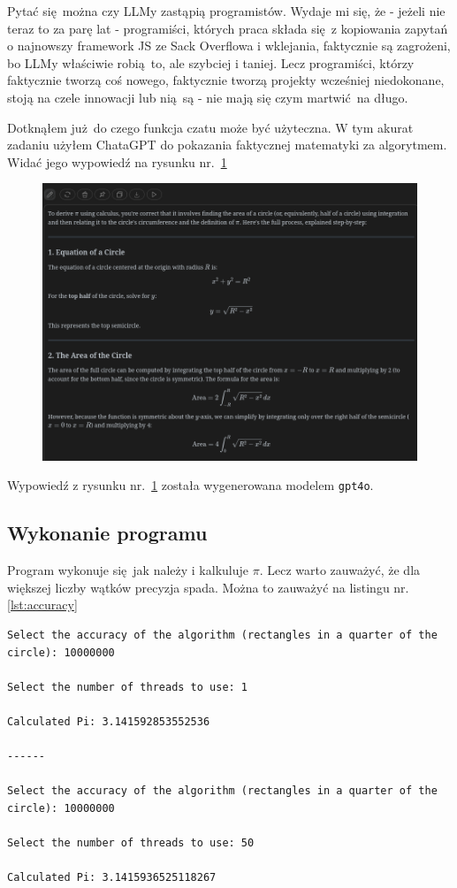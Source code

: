 Pytać się można czy LLMy zastąpią programistów. Wydaje mi się, że - jeżeli nie teraz to za parę lat - programiści, których praca składa się z kopiowania zapytań o najnowszy framework JS ze Sack Overflowa i wklejania, faktycznie są zagrożeni, bo LLMy właściwie robią to, ale szybciej i taniej. Lecz programiści, którzy faktycznie tworzą coś nowego, faktycznie tworzą projekty wcześniej niedokonane, stoją na czele innowacji lub nią są - nie mają się czym martwić na długo.

Dotknąłem już do czego funkcja czatu może być użyteczna. W tym akurat zadaniu użyłem ChataGPT do pokazania faktycznej matematyki za algorytmem. Widać jego wypowiedź na rysunku nr.~\ref{fig:chatgptpcalka} 

\begin{figure}[H]
	\centering
	\includegraphics[width=1\textwidth]{images/chatgpt_calka.png}
	\caption{}
	\label{fig:chatgptpcalka}
\end{figure}

Wypowiedź z rysunku nr.~\ref{fig:chatgptpcalka} została wygenerowana modelem \texttt{gpt4o}.

\subsection{Wykonanie programu}

Program wykonuje się jak należy i kalkuluje $\pi$. Lecz warto zauważyć, że dla większej liczby wątków precyzja spada. Można to zauważyć na listingu nr. \ref{lst:accuracy}

\begin{lstlisting}[caption=Funkcja \texttt{getPi()}, label={lst:accuracy}, language=plaintext]
Select the accuracy of the algorithm (rectangles in a quarter of the circle): 10000000

Select the number of threads to use: 1

Calculated Pi: 3.141592853552536

------

Select the accuracy of the algorithm (rectangles in a quarter of the circle): 10000000

Select the number of threads to use: 50

Calculated Pi: 3.1415936525118267
\end{lstlisting}

